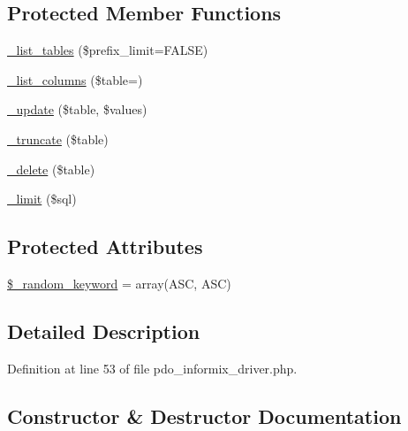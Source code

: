 \subsection*{Protected Member Functions}
\begin{DoxyCompactItemize}
\item 
\mbox{\hyperlink{class_c_i___d_b__pdo__informix__driver_a435c0f3ce54fe7daa178baa8532ebd54}{\+\_\+list\+\_\+tables}} (\$prefix\+\_\+limit=F\+A\+L\+SE)
\item 
\mbox{\hyperlink{class_c_i___d_b__pdo__informix__driver_a7ccb7f9c301fe7f0a9db701254142b63}{\+\_\+list\+\_\+columns}} (\$table=\textquotesingle{}\textquotesingle{})
\item 
\mbox{\hyperlink{class_c_i___d_b__pdo__informix__driver_a2540b03a93fa73ae74c10d0e16fc073e}{\+\_\+update}} (\$table, \$values)
\item 
\mbox{\hyperlink{class_c_i___d_b__pdo__informix__driver_aa029600528fc1ce660a23ff4b4667f95}{\+\_\+truncate}} (\$table)
\item 
\mbox{\hyperlink{class_c_i___d_b__pdo__informix__driver_a133ea8446ded52589bd22cc9163d0896}{\+\_\+delete}} (\$table)
\item 
\mbox{\hyperlink{class_c_i___d_b__pdo__informix__driver_a3a02ea06541b8ecc25a33a61651562c8}{\+\_\+limit}} (\$sql)
\end{DoxyCompactItemize}
\subsection*{Protected Attributes}
\begin{DoxyCompactItemize}
\item 
\mbox{\hyperlink{class_c_i___d_b__pdo__informix__driver_a10213aa6e05f6d924d3277bb1d2fea00}{\$\+\_\+random\+\_\+keyword}} = array(\textquotesingle{}A\+SC\textquotesingle{}, \textquotesingle{}A\+SC\textquotesingle{})
\end{DoxyCompactItemize}


\subsection{Detailed Description}


Definition at line 53 of file pdo\+\_\+informix\+\_\+driver.\+php.



\subsection{Constructor \& Destructor Documentation}
\mbox{\label{class_c_i___d_b__pdo__informix__driver_a9162320adff1a1a4afd7f2372f753a3e}} 
